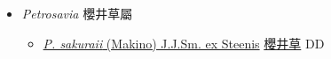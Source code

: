 
  \begin{itemize}
 \item[] \textit{Petrosavia} 櫻井草屬
                    
  \begin{itemize}
        \item[] \href{http://www.theplantlist.org/tpl1.1/search?q=Petrosavia+sakuraii}{\textit{P. sakuraii} (Makino) J.J.Sm. ex Steenis}   \href{\detokenize{http://taibnet.sinica.edu.tw/chi/taibnet_species_list.php?T2=櫻井草&T2_new_value=true&fr=y}}{櫻井草} DD
  \end{itemize}
  \end{itemize}
